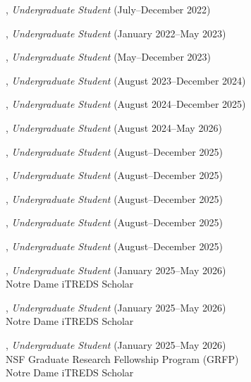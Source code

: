 \documentclass[10pt]{article}
\newenvironment{myindentpar}[1]%
{\begin{list}{}%
         {\setlength{\leftmargin}{#1}}%
         \item[]%
}
{\end{list}}
\newcounter{list}
\begin{document}
\begin{myindentpar}{0.75cm}
\hspace{-0.75cm}{\bf William Porter}, \textit{Undergraduate Student} (July--December 2022)

\hspace{-0.75cm}{\bf Weike Fang}, \textit{Undergraduate Student} (January 2022--May 2023)

\hspace{-0.75cm}{\bf David Liu}, \textit{Undergraduate Student} (May--December 2023)

\hspace{-0.75cm}{\bf John Flanagan}, \textit{Undergraduate Student} (August 2023--December 2024)

\hspace{-0.75cm}{\bf Olivia Zino}, \textit{Undergraduate Student} (August 2024--December 2025)

\hspace{-0.75cm}{\bf Lang Li}, \textit{Undergraduate Student} (August 2024--May 2026)

\hspace{-0.75cm}{\bf Ethan Sotka}, \textit{Undergraduate Student} (August--December 2025)

\hspace{-0.75cm}{\bf Jack Keller}, \textit{Undergraduate Student} (August--December 2025)

\hspace{-0.75cm}{\bf Ralph Gonzalez}, \textit{Undergraduate Student} (August--December 2025)

\hspace{-0.75cm}{\bf Christopher Bond}, \textit{Undergraduate Student} (August--December 2025)

\hspace{-0.75cm}{\bf Tim Gunn}, \textit{Undergraduate Student} (August--December 2025)

\hspace{-0.75cm}{\bf Zach Petko}, \textit{Undergraduate Student} (January 2025--May 2026) \\
	{Notre Dame iTREDS Scholar}

\hspace{-0.75cm}{\bf Vince Andriacco}, \textit{Undergraduate Student} (January 2025--May 2026) \\
	{Notre Dame iTREDS Scholar}

\hspace{-0.75cm}{\bf John Kim}, \textit{Undergraduate Student} (January 2025--May 2026) \\
	{NSF Graduate Research Fellowship Program (GRFP)} \\
	{Notre Dame iTREDS Scholar}
	

\end{myindentpar}
\end{document}
